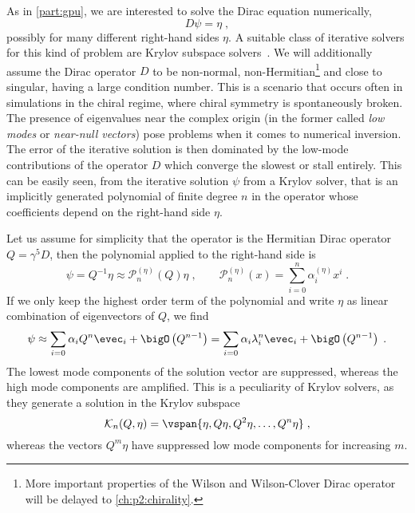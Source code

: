 As in \cref{part:gpu}, we are interested to solve the Dirac equation numerically,
\begin{equation} \label{eq:var:dirac:equation}
D \psi = \eta \;,
\end{equation}
possibly for many different right-hand sides $\eta$.
A suitable class of iterative solvers for this kind of problem are Krylov subspace solvers~\cite{krylov1931numerical,book:saad2003iterative}.
We will additionally assume the Dirac operator $D$ to be non-normal, non-Hermitian\footnote{More important properties of the Wilson and Wilson-Clover Dirac operator will be delayed to \cref{ch:p2:chirality}.} and close to singular, \ie having a large condition number.
This is a scenario that occurs often in simulations in the chiral regime, where chiral symmetry is spontaneously broken.
The presence of eigenvalues near the complex origin (in the former called \emph{low modes} or \emph{near-null vectors}) pose problems when it comes to numerical inversion.
The error of the iterative solution is then dominated by the low-mode contributions of the operator $D$ which converge the slowest or stall entirely.
This can be easily seen, from the iterative solution $\psi$ from a Krylov solver, that is an implicitly generated polynomial of finite degree $n$ in the operator whose coefficients depend on the right-hand side $\eta$.

Let us assume for simplicity that the operator is the Hermitian Dirac operator $Q = \gamma^{5}D$, then the polynomial applied to the right-hand side is
\begin{equation}
\psi = Q^{-1} \eta \approx \mathcal{P}_{n}^{(\eta)}(Q) \eta \;,
\qquad
\mathcal{P}_{n}^{(\eta)}(x) = \sum_{i=0}^{n} \alpha_{i}^{(\eta)} x^i \;.
\end{equation}
If we only keep the highest order term of the polynomial and write $\eta$ as linear combination of eigenvectors of $Q$, we find
\begin{eqnarray}
\psi
\approx \sum_{i=0} \alpha_i Q^{n} \evec_i + \bigO\left(Q^{n-1}\right)
= \sum_{i=0} \alpha_i \lambda_i^{n} \evec_i + \bigO\left(Q^{n-1}\right) \;.
\end{eqnarray}
The lowest mode components of the solution vector are suppressed, whereas the high mode components are amplified.
This is a peculiarity of Krylov solvers, as they generate a solution in the Krylov subspace~\cite{wright2006numerical,simoncini2003theory}
\begin{equation}
\mathcal{K}_n(Q, \eta) = \vspan{ \eta, Q \eta, Q^{2} \eta, \ldots, Q^{n} \eta } \;,
\end{equation}
whereas the vectors $Q^{m} \eta$ have suppressed low mode components for increasing $m$.

